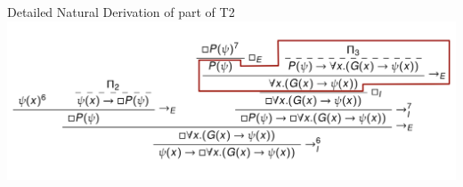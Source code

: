 \begin{frame}{Detailed Natural Derivation of part of T2} \small
\includegraphics[scale=0.22]{ProofOfT2Boxed.pdf}
\end{frame}
